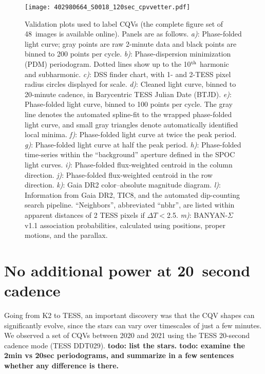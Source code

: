 \documentclass[11pt,twocolumn,tighten]{aastex63}
\newcommand{\ncpvsfound}{{48}}
\begin{document}
\begin{figure*}[!t]
	\begin{center}
    \centering
    \texttt{[image: 402980664\_S0018\_120sec\_cpvvetter.pdf]}
		\vspace{-0.45cm}
		\caption{
      Validation plots used to label CQVs (the complete figure
      set of \ncpvsfound\ images is available online).
      Panels are as follows.
      {\it a)}: Phase-folded light curve; gray points are raw 2-minute
      data and black points are binned to 200 points per cycle.
      {\it b)}: Phase-dispersion minimization (PDM) periodogram.
      Dotted lines show up to the 10$^{\rm th}$ harmonic and
      subharmonic.
      {\it c)}: DSS finder chart, with 1- and 2-TESS pixel radius
      circles displayed for scale.
      {\it d)}: Cleaned light curve, binned to 20-minute cadence, in
      Barycentric TESS Julian Date (BTJD).
      {\it e)}: Phase-folded light curve, binned to 100 points per
      cycle.  The gray line denotes the automated spline-fit to the
      wrapped phase-folded light curve, and small gray triangles
      denote automatically identified local minima.
      {\it f)}: Phase-folded light curve at twice the peak period.
      {\it g)}: Phase-folded light curve at half the peak period.
      {\it h)}: Phase-folded time-series within the ``background''
      aperture defined in the SPOC light curves.
      {\it i)}: Phase-folded flux-weighted centroid in the column
      direction.
      {\it j)}: Phase-folded flux-weighted centroid in the row
      direction.
      {\it k)}: Gaia DR2 color--absolute magnitude diagram.     
      {\it l)}: Information from Gaia DR2, TIC8, and the automated
      dip-counting search pipeline.  ``Neighbors'', abbreviated
      ``nbhr'', are listed within apparent distances of 2 TESS pixels
      if $\Delta T$$<$2.5.
      {\it m)}: BANYAN-$\Sigma$ v1.1 association probabilities, calculated
      using positions, proper motions, and the parallax.
      }
		\label{fig:vet}
	\end{center}
\end{figure*}


\section{No additional power at 20~second cadence}

Going from K2 to TESS, an important discovery was that the CQV shapes
can significantly evolve, since the stars can vary over timescales of just a few minutes.
We observed a set of CQVs between 2020 and 2021 using the TESS 20-second
cadence mode (TESS DDT029).
{\bf todo: list the stars.  todo: examine the 2min vs 20sec periodograms, and summarize in a few
sentences whether any difference is there.}



\clearpage
\listofchanges
\end{document}
